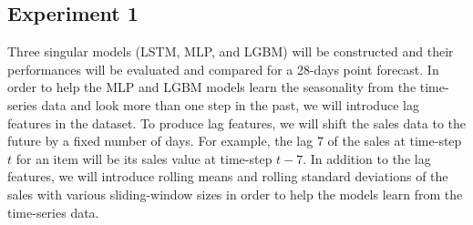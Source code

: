 \subsection*{Experiment 1}
Three singular models (LSTM, MLP, and LGBM) will be constructed and their performances will be evaluated and compared for a 28-days point forecast. 
In order to help the MLP and LGBM models learn the seasonality from the time-series data and look more than one step in the past, we will introduce lag features in the dataset. 
To produce lag features, we will shift the sales data to the future by a fixed number of days. 
For example, the lag 7 of the sales at time-step \(t\) for an item will be its sales value at time-step \(t-7\). 
In addition to the lag features, we will introduce rolling means and rolling standard deviations of the sales with various sliding-window sizes in order to help the models learn from the time-series data.

